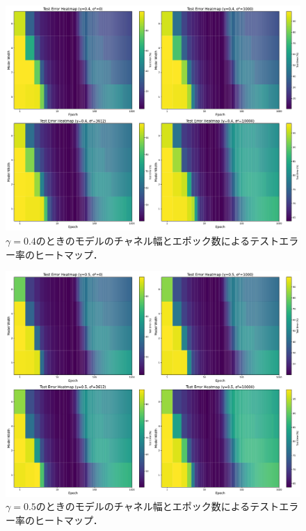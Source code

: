 \begin{figure}[H]
    \centering
    \includegraphics[width=\linewidth]{fig/heatmap_ln/ln0.4.pdf}
    \caption{$\gamma=0.4$のときのモデルのチャネル幅とエポック数によるテストエラー率のヒートマップ．}
    \label{fig:modelwidth_heatmap_0.4}
\end{figure}

\begin{figure}[H]
    \centering
    \includegraphics[width=\linewidth]{fig/heatmap_ln/ln0.5.pdf}
    \caption{$\gamma=0.5$のときのモデルのチャネル幅とエポック数によるテストエラー率のヒートマップ．}
    \label{fig:modelwidth_heatmap_0.5}
\end{figure}

